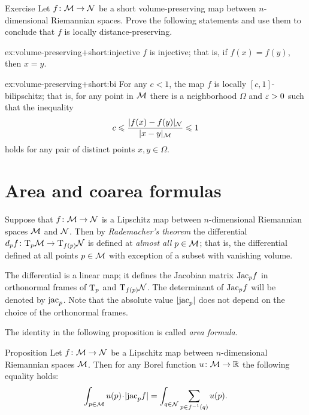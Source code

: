 \begin{thm}{Exercise}\label{ex:volume-preserving+short}
Let $f\colon\mathcal{M}\to \mathcal{N}$ be a short volume-preserving map between $n$-dimensional Riemannian spaces.
Prove the following statements and use them to conclude that $f$ is locally distance-preserving.

\begin{subthm}{ex:volume-preserving+short:injective}
$f$ is injective; 
that is, if $f(x)=f(y)$, then $x=y$.
\end{subthm}

\begin{subthm}{ex:volume-preserving+short:bi}
For any $c<1$, the map $f$ is locally $[c,1]$-bilipschitz;
that is, for any point in $\mathcal{M}$ there is a neighborhood $\Omega$ and $\varepsilon>0$ such that the inequality 
\[c\leqslant \frac{|f(x)-f(y)|_{\mathcal{N}}}{|x-y|_{\mathcal{M}}}\leqslant 1 \]
holds for any pair of distinct points $x,y\in \Omega$.
\end{subthm}

\end{thm}


\section{Area and coarea formulas}

Suppose that $f\colon\mathcal{M}\to\mathcal{N}$ is a Lipschitz map between $n$-dimensional Riemannian spaces $\mathcal{M}$ and $\mathcal{N}$.
Then by \emph{Rademacher's theorem} 
the differential $d_p f\colon\mathrm{T}_p\mathcal{M}\to\mathrm{T}_{f(p)}\mathcal{N}$ is defined at \emph{almost all} $p\in \mathcal{M}$;
that is, the differential defined at all points $p\in\mathcal{M}$ with exception of a subset with vanishing volume.

The differential is a linear map; it defines the Jacobian matrix $\mathrm{Jac}_pf$ in orthonormal frames of $\mathrm{T}_p$ and $\mathrm{T}_{f(p)}\mathcal{N}$.
The determinant of $\mathrm{Jac}_pf$ will be denoted by $\mathrm{jac}_p$.
Note that the absolute value $|\mathrm{jac}_p|$ does not depend on the choice of the orthonormal frames.

The identity in the following proposition is called \emph{area formula}.

\begin{thm}{Proposition}
Let $f\colon\mathcal{M}\to\mathcal{N}$ be a Lipschitz map between $n$-dimensional Riemannian spaces $\mathcal{M}$.
Then for  any Borel function $u\:\spc{M}\z\to \RR$ the following equality holds:
\[\int_{p\in \spc{M}} u(p)\cdot |\jac_pf|=\int_{q\in \spc{N}}\sum_{p\in f^{-1}(q)} u(p).\]

\end{thm}


